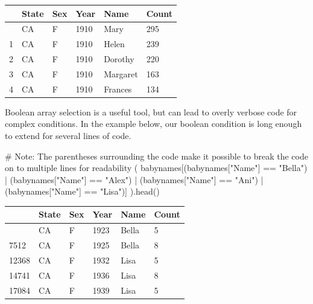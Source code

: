 \documentclass[
  letterpaper,
  DIV=11,
  numbers=noendperiod]{scrreprt}
\newenvironment{Shaded}{\begin{snugshade}}{\end{snugshade}}
\newcommand{\CommentTok}[1]{\textcolor[rgb]{0.37,0.37,0.37}{#1}}
\newcommand{\NormalTok}[1]{\textcolor[rgb]{0.00,0.23,0.31}{#1}}
\newcommand{\OperatorTok}[1]{\textcolor[rgb]{0.37,0.37,0.37}{#1}}
\newcommand{\StringTok}[1]{\textcolor[rgb]{0.13,0.47,0.30}{#1}}
\begin{document}
\begin{longtable}[]{@{}llllll@{}}
\toprule\noalign{}
& State & Sex & Year & Name & Count \\
\midrule\noalign{}
\endhead
\bottomrule\noalign{}
\endlastfoot
0 & CA & F & 1910 & Mary & 295 \\
1 & CA & F & 1910 & Helen & 239 \\
2 & CA & F & 1910 & Dorothy & 220 \\
3 & CA & F & 1910 & Margaret & 163 \\
4 & CA & F & 1910 & Frances & 134 \\
\end{longtable}

Boolean array selection is a useful tool, but can lead to overly verbose
code for complex conditions. In the example below, our boolean condition
is long enough to extend for several lines of code.

\begin{Shaded}
\begin{Highlighting}[]
\CommentTok{\# Note: The parentheses surrounding the code make it possible to break the code on to multiple lines for readability}
\NormalTok{(}
\NormalTok{    babynames[(babynames[}\StringTok{"Name"}\NormalTok{] }\OperatorTok{==} \StringTok{"Bella"}\NormalTok{) }\OperatorTok{|} 
\NormalTok{              (babynames[}\StringTok{"Name"}\NormalTok{] }\OperatorTok{==} \StringTok{"Alex"}\NormalTok{) }\OperatorTok{|}
\NormalTok{              (babynames[}\StringTok{"Name"}\NormalTok{] }\OperatorTok{==} \StringTok{"Ani"}\NormalTok{) }\OperatorTok{|}
\NormalTok{              (babynames[}\StringTok{"Name"}\NormalTok{] }\OperatorTok{==} \StringTok{"Lisa"}\NormalTok{)]}
\NormalTok{).head()}
\end{Highlighting}
\end{Shaded}

\begin{longtable}[]{@{}llllll@{}}
\toprule\noalign{}
& State & Sex & Year & Name & Count \\
\midrule\noalign{}
\endhead
\bottomrule\noalign{}
\endlastfoot
6289 & CA & F & 1923 & Bella & 5 \\
7512 & CA & F & 1925 & Bella & 8 \\
12368 & CA & F & 1932 & Lisa & 5 \\
14741 & CA & F & 1936 & Lisa & 8 \\
17084 & CA & F & 1939 & Lisa & 5 \\
\end{longtable}
\end{document}
